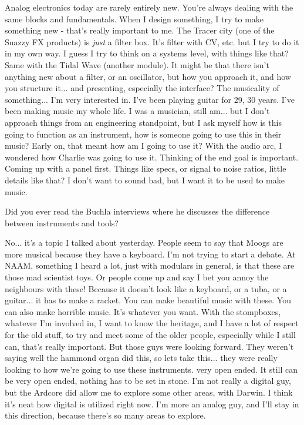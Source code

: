 Analog electronics today are rarely entirely new. You're always dealing with the same blocks and fundamentals. When I design something, I try to make something new - that's really important to me. The Tracer city (one of the Snazzy FX products) is \emph{just} a filter box. It's filter with CV, etc. but I try to do it in my own way. I guess I try to think on a systems level, with things like that? Same with the Tidal Wave (another module). It might be that there isn't anything new about a filter, or an oscillator, but how you approach it, and how you structure it... and presenting, especially the interface? The musicality of something... I'm very interested in. I've been playing guitar for 29, 30 years. I've been making music my whole life. I was a musician, still am... but I don't approach things from an engineering standpoint, but I ask myself how is this going to function as an instrument, how is someone going to use this in their music? Early on, that meant how am I going to use it? With the audio arc, I wondered how Charlie was going to use it. Thinking of the end goal is important. Coming up with a panel first. Things like specs, or signal to noise ratios, little details like that? I don't want to sound bad, but I want it to be used to make music. 

Did you ever read the Buchla interviews where he discusses the difference between instruments and tools? 

No... it's a topic I talked about yesterday. People seem to say that Moogs are more musical because they have a keyboard. I'm not trying to start a debate. At NAAM, something I heard a lot, just with modulars in general, is that these are those mad scientist toys. Or people come up and say I bet you annoy the neighbours with these! Because it doesn't look like a keyboard, or a tuba, or a guitar... it has to make a racket. You can make beautiful music with these. You can also make horrible music. It's whatever you want. With the stompboxes, whatever I'm involved in, I want to know the heritage, and I have a lot of respect for the old stuff, to try and meet some of the older people, especially while I still can, that's really important. But those guys were looking forward. They weren't saying well the hammond organ  did this, so lets take this... they were really looking to how we're going to use these instruments. very open ended. It still can be very open ended, nothing has to be set in stone. I'm not really a digital guy, but the Ardcore did allow me to explore some other areas, with Darwin. I think it's neat how digital is utilized right now. I'm more an analog guy, and I'll stay in this direction, because there's so many areas to explore. 

